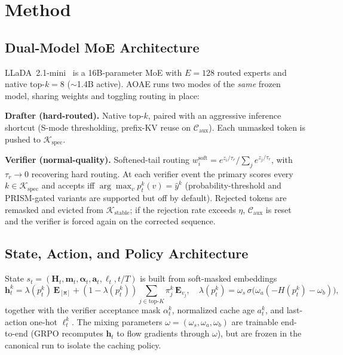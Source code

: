 \documentclass[11pt]{article}
\newcommand{\cK}{\mathcal{K}}
\newcommand{\cC}{\mathcal{C}}
\newcommand{\bh}{\mathbf{h}}
\newcommand{\bH}{\mathbf{H}}
\newcommand{\bfm}{\mathbf{m}}
\newcommand{\mask}{\ensuremath{\mathtt{[M]}}}
\begin{document}
\section{Method}
\label{sec:method}

\subsection{Dual-Model MoE Architecture}

LLaDA~2.1-mini~\cite{llada21} is a 16B-parameter MoE with $E{=}128$ routed experts and native top-$k{=}8$ (${\sim}$1.4B active).
AOAE runs two modes of the \emph{same} frozen model, sharing weights and toggling routing in place:

\textbf{Drafter (hard-routed).}  Native top-$k$, paired with an aggressive inference shortcut (S-mode thresholding, prefix-KV reuse on $\cC_{\text{aux}}$).  Each unmasked token is pushed to $\cK_{\text{spec}}$.

\textbf{Verifier (normal-quality).}  Softened-tail routing
$w_i^{\text{soft}} = e^{z_i / \tau_r}\big/\sum_j e^{z_j / \tau_r}$, with $\tau_r \to 0$ recovering hard routing.
At each verifier event the primary scores every $k \in \cK_{\text{spec}}$ and accepts iff $\arg\max_v p_t^k(v) = \hat{y}^k$ (probability-threshold and PRISM-gated variants are supported but off by default).
Rejected tokens are remasked and evicted from $\cK_{\text{stable}}$; if the rejection rate exceeds $\eta$, $\cC_{\text{aux}}$ is reset and the verifier is forced again on the corrected sequence.

\subsection{State, Action, and Policy Architecture}

State $s_t = (\bH_t, \bfm_t, \bm{\alpha}_t, \bm{a}_t, \bm{\ell}_t, t/T)$ is built from soft-masked embeddings~\cite{hersche2025softmasked}
\begin{equation}
    \bh_t^k = \lambda(p_t^k)\,\mathbf{E}_{\mask} + (1{-}\lambda(p_t^k))\!\!\sum_{j \in \text{top-}K}\!\! \pi_j^k\,\mathbf{E}_{v_j},
    \quad \lambda(p_t^k) = \omega_s\,\sigma\!\bigl(\omega_a(-H(p_t^k) - \omega_b)\bigr),
    \label{eq:softmask}
\end{equation}
together with the verifier acceptance mask $\alpha_t^k$, normalized cache age $a_t^k$, and last-action one-hot $\ell_t^k$.
The mixing parameters $\omega = (\omega_s, \omega_a, \omega_b)$ are trainable end-to-end (GRPO recomputes $\bh_t$ to flow gradients through $\omega$), but are frozen in the canonical run to isolate the caching policy.
\end{document}
